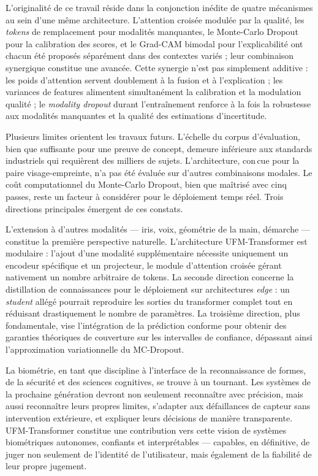 \documentclass[12pt,a4paper]{report}
\begin{document}
L'originalit\'{e} de ce travail r\'{e}side dans la conjonction in\'{e}dite de quatre m\'{e}canismes au sein d'une m\^{e}me architecture. L'attention crois\'{e}e modul\'{e}e par la qualit\'{e}, les \emph{tokens} de remplacement pour modalit\'{e}s manquantes, le Monte-Carlo Dropout pour la calibration des scores, et le Grad-CAM bimodal pour l'explicabilit\'{e} ont chacun \'{e}t\'{e} propos\'{e}s s\'{e}par\'{e}ment dans des contextes vari\'{e}s ; leur combinaison synergique constitue une avanc\'{e}e. Cette synergie n'est pas simplement additive : les poids d'attention servent doublement \`{a} la fusion et \`{a} l'explication ; les variances de features alimentent simultan\'{e}ment la calibration et la modulation qualit\'{e} ; le \emph{modality dropout} durant l'entra\^{i}nement renforce \`{a} la fois la robustesse aux modalit\'{e}s manquantes et la qualit\'{e} des estimations d'incertitude.

Plusieurs limites orientent les travaux futurs. L'\'{e}chelle du corpus d'\'{e}valuation, bien que suffisante pour une preuve de concept, demeure inf\'{e}rieure aux standards industriels qui requi\`{e}rent des milliers de sujets. L'architecture, con\,{c}ue pour la paire visage-empreinte, n'a pas \'{e}t\'{e} \'{e}valu\'{e}e sur d'autres combinaisons modales. Le co\^{u}t computationnel du Monte-Carlo Dropout, bien que ma\^{i}tris\'{e} avec cinq passes, reste un facteur \`{a} consid\'{e}rer pour le d\'{e}ploiement temps r\'{e}el. Trois directions principales \'{e}mergent de ces constats.

L'extension \`{a} d'autres modalit\'{e}s --- iris, voix, g\'{e}om\'{e}trie de la main, d\'{e}marche --- constitue la premi\`{e}re perspective naturelle. L'architecture UFM-Transformer est modulaire : l'ajout d'une modalit\'{e} suppl\'{e}mentaire n\'{e}cessite uniquement un encodeur sp\'{e}cifique et un projecteur, le module d'attention crois\'{e}e g\'{e}rant nativement un nombre arbitraire de tokens. La seconde direction concerne la distillation de connaissances pour le d\'{e}ploiement sur architectures \emph{edge} : un \emph{student} all\'{e}g\'{e} pourrait reproduire les sorties du transformer complet tout en r\'{e}duisant drastiquement le nombre de param\`{e}tres. La troisi\`{e}me direction, plus fondamentale, vise l'int\'{e}gration de la pr\'{e}diction conforme \cite{balomenos2018conformal} pour obtenir des garanties th\'{e}oriques de couverture sur les intervalles de confiance, d\'{e}passant ainsi l'approximation variationnelle du MC-Dropout.

La biom\'{e}trie, en tant que discipline \`{a} l'interface de la reconnaissance de formes, de la s\'{e}curit\'{e} et des sciences cognitives, se trouve \`{a} un tournant. Les syst\`{e}mes de la prochaine g\'{e}n\'{e}ration devront non seulement reconna\^{i}tre avec pr\'{e}cision, mais aussi reconna\^{i}tre leurs propres limites, s'adapter aux d\'{e}faillances de capteur sans intervention ext\'{e}rieure, et expliquer leurs d\'{e}cisions de mani\`{e}re transparente. UFM-Transformer constitue une contribution vers cette vision de syst\`{e}mes biom\'{e}triques autonomes, confiants et interpr\'{e}tables --- capables, en d\'{e}finitive, de juger non seulement de l'identit\'{e} de l'utilisateur, mais \'{e}galement de la fiabilit\'{e} de leur propre jugement.
\end{document}
